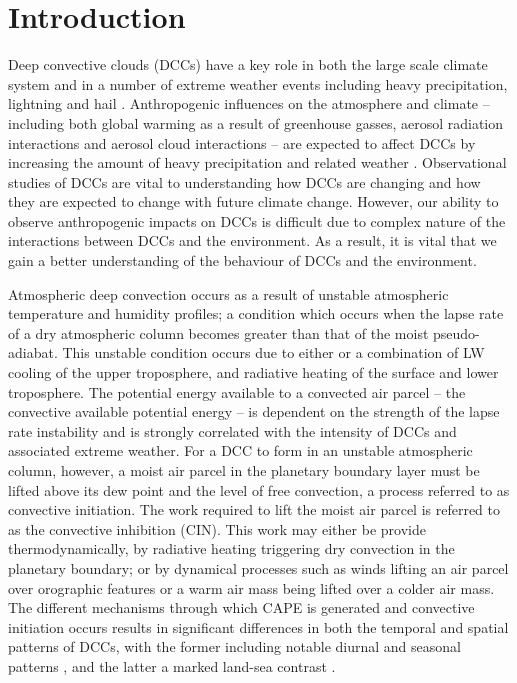 \section{Introduction}  %
Deep convective clouds (DCCs) have a key role in both the large scale climate system and in a number of extreme weather events including heavy precipitation, lightning and hail \citep[e.g.][]{westra_future_2014, houze_chapter_2014, williams_radar_1992, bruning_theory_2013, punge_hail_2016, matsudo_severe_2011}.
Anthropogenic influences on the atmosphere and climate -- including both global warming as a result of greenhouse gasses, aerosol radiation interactions and aerosol cloud interactions -- are expected to affect DCCs by increasing the amount of heavy precipitation and related weather \citep[e.g.][]{allen_constraints_2002, trenberth_changing_2003, held_robust_2006, khain2005aerosol, koren_smoke_2008, rosenfeld_flood_2008, fan_microphysical_2013, fan_review_2016}.
Observational studies of DCCs are vital to understanding how DCCs are changing and how they are expected to change with future climate change.
However, our ability to observe anthropogenic impacts on DCCs is difficult due to complex nature of the interactions between DCCs and the environment.
As a result, it is vital that we gain a better understanding of the behaviour of DCCs and the environment.

Atmospheric deep convection occurs as a result of unstable atmospheric temperature and humidity profiles; a condition which occurs when the lapse rate of a dry atmospheric column becomes greater than that of the moist pseudo-adiabat.
This unstable condition occurs due to either or a combination of LW cooling of the upper troposphere, and radiative heating of the surface and lower troposphere.
The potential energy available to a convected air parcel -- the convective available potential energy -- is dependent on the strength of the lapse rate instability and is strongly correlated with the intensity of DCCs and associated extreme weather.
For a DCC to form in an unstable atmospheric column, however, a moist air parcel in the planetary boundary layer must be lifted above its dew point and the level of free convection, a process referred to as convective initiation.
The work required to lift the moist air parcel is referred to as the convective inhibition (CIN).
This work may either be provide thermodynamically, by radiative heating triggering dry convection in the planetary boundary; or by dynamical processes such as winds lifting an air parcel over orographic features or a warm air mass being lifted over a colder air mass.
The different mechanisms through which CAPE is generated and convective initiation occurs results in significant differences in both the temporal and spatial patterns of DCCs, with the former including notable diurnal and seasonal patterns \citep{chen_diurnal_1997}, and the latter a marked land-sea contrast \citep{taylor_evaluating_2017}.

